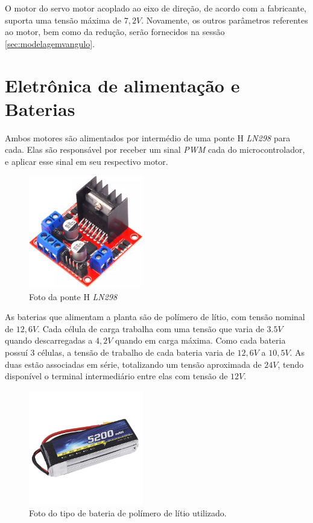 	    O motor do servo motor acoplado ao eixo de direção, de acordo com a fabricante, suporta uma tensão máxima de $7,2V$. Novamente, os outros parâmetros referentes ao motor, bem como da redução, serão fornecidos na sessão \ref{sec:modelagemvangulo}.
	
	\section{Eletrônica de alimentação e Baterias}
	    
	    Ambos motores são alimentados por intermédio de uma ponte H \textit{LN298} para cada. Elas são responsável por receber um sinal \textit{PWM} cada do microcontrolador, e aplicar esse sinal em seu respectivo motor.
	
    	\begin{figure}[h]
            \centering
            \includegraphics[width=5cm]{Imagens/cap2/ln298.png}
            \caption{Foto da ponte H \textit{LN298}}
            \label{img:theta}
        \end{figure}
    
	    As baterias que alimentam a planta são de polímero de lítio, com tensão nominal de $12,6V$. Cada célula de carga trabalha com uma tensão que varia de $3.5V$ quando descarregadas a $4,2V$ quando em carga máxima. Como cada bateria possuí 3 células, a tensão de trabalho de cada bateria varia de $12,6V$ a $10,5V$. As duas estão associadas em série, totalizando um tensão aproximada de $24V$, tendo disponível o terminal intermediário entre elas com tensão de $12V$.
	
    	\begin{figure}[h]
            \centering
            \includegraphics[width=5cm]{Imagens/cap2/bateria.jpg}
            \caption{Foto do tipo de bateria de polímero de lítio utilizado.}
            \label{img:theta}
        \end{figure}
	    
